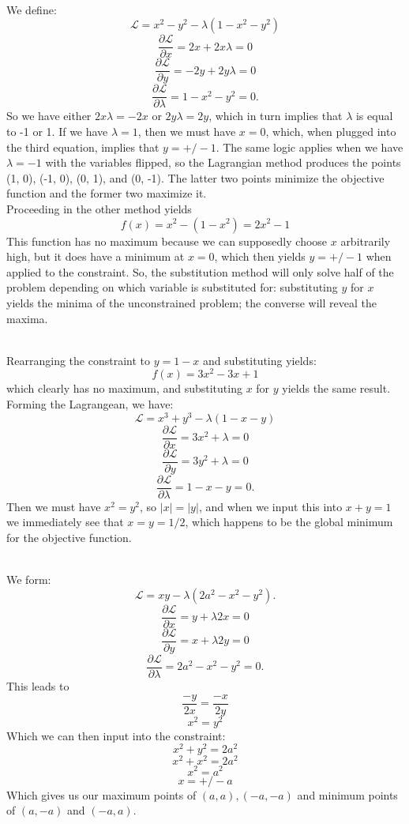 \documentclass[12pt,leqno]{article}
\newcommand{\lgrange}{\mathscr{L}}
\begin{document}
\bigskip
{}\\
\indent We define:
$$\lgrange = x^2 - y^2 - \lambda(1 - x^2 - y^2)$$
$$\frac{\partial \lgrange}{\partial x} = 2x + 2x\lambda=0$$
$$\frac{\partial \lgrange}{\partial y} = -2y + 2y\lambda = 0$$
$$\frac{\partial \lgrange}{\partial \lambda} = 1- x^2 -y^2 = 0.$$
So we have either $2x\lambda = -2x$ or $2y\lambda = 2y$, which in turn implies that $\lambda$ is equal to -1 or 1. If we have $\lambda=1$, then we must have $x=0$, which, when plugged into the third equation, implies that $y = +/- 1$. The same logic applies when we have $\lambda = -1$ with the variables flipped, so the Lagrangian method produces the points (1, 0), (-1, 0), (0, 1), and (0, -1). The latter two points minimize the objective function and the former two maximize it. \\
\indent Proceeding in the other method yields
$$f(x) = x^2 - (1-x^2) = 2x^2 - 1$$
This function has no maximum because we can supposedly choose $x$ arbitrarily high, but it does have a minimum at $x=0$, which then yields $y = +/- 1$ when applied to the constraint. So, the substitution method will only solve half of the problem depending on which variable is substituted for: substituting $y$ for $x$ yields the minima of the unconstrained problem; the converse will reveal the maxima.


\bigskip
{}\\
\indent Rearranging the constraint to $y = 1-x$ and substituting yields:
$$f(x) = 3x^2 - 3x + 1$$
which clearly has no maximum, and substituting $x$ for $y$ yields the same result. Forming the Lagrangean, we have:
$$\lgrange = x^3 + y^3 - \lambda(1 - x - y)$$
$$\frac{\partial \lgrange}{\partial x} = 3x^2 + \lambda = 0$$
$$\frac{\partial \lgrange}{\partial y} = 3y^2 + \lambda = 0$$
$$\frac{\partial \lgrange}{\partial \lambda} = 1 - x - y = 0.$$
Then we must have $x^2 = y^2$, so $|x| = |y|$, and when we input this into $x + y = 1$ we immediately see that $x = y = 1/2$, which happens to be the global minimum for the objective function.

\bigskip
{}\\
\indent We form:
$$\lgrange = xy - \lambda(2a^2 - x^2-y^2).$$
$$\frac{\partial \lgrange}{\partial x} = y + \lambda2x = 0$$
$$\frac{\partial \lgrange}{\partial y} = x +  \lambda2y = 0$$
$$\frac{\partial \lgrange}{\partial \lambda} = 2a^2 - x^2 - y^2 = 0.$$
This leads to
$$\frac{-y}{2x} = \frac{-x}{2y}$$
$$x^2 = y^2$$
Which we can then input into the constraint:
$$x^2 + y^2 = 2a^2$$
$$x^2 + x^2 = 2a^2$$
$$x^2 = a^2$$
$$x = +/-a$$
Which gives us our maximum points of $(a, a), (-a, -a)$ and minimum points of $(a, -a)$ and $(-a, a)$. 
\end{document}

